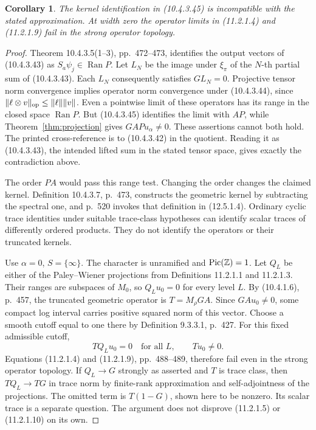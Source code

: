 \documentclass[11pt,reqno]{amsart}
\newtheorem{corollary}[theorem]{Corollary}
\numberwithin{equation}{section}
\begin{document}
\begin{corollary}
The kernel identification in (10.4.3.45) is incompatible with the stated approximation. At width zero the operator limits in (11.2.1.4) and (11.2.1.9) fail in the strong operator topology.
\end{corollary}
\begin{proof}

Theorem 10.4.3.5(1--3), pp.~472--473, identifies the output vectors of (10.4.3.43) as \(S_a\psi_j\in\operatorname{Ran}P\). Let \(L_N\) be the image under \(\xi_\pi\) of the \(N\)-th partial sum of (10.4.3.43). Each \(L_N\) consequently satisfies \(G L_N=0\). Projective tensor norm convergence implies operator norm convergence under (10.4.3.44), since \(\|\ell\otimes v\|_{\rm op}\le\|\ell\|\|v\|\). Even a pointwise limit of these operators has its range in the closed space \(\operatorname{Ran}P\). But (10.4.3.45) identifies the limit with \(AP\), while Theorem~\ref{thm:projection} gives \(GAPu_\alpha\ne0\). These assertions cannot both hold. The printed cross-reference is to (10.4.3.42) in the quotient. Reading it as (10.4.3.43), the intended lifted sum in the stated tensor space, gives exactly the contradiction above.

The order \(PA\) would pass this range test. Changing the order changes the claimed kernel. Definition 10.4.3.7, p.~473, constructs the geometric kernel by subtracting the spectral one, and p.~520 invokes that definition in (12.5.1.4). Ordinary cyclic trace identities under suitable trace-class hypotheses can identify scalar traces of differently ordered products. They do not identify the operators or their truncated kernels.
\par\smallskip
Use \(\alpha=0\), \(S=\{\infty\}\). The character is unramified and \(\operatorname{Pic}(\mathbb Z)=1\). Let \(Q_L\) be either of the Paley--Wiener projections from Definitions 11.2.1.1 and 11.2.1.3. Their ranges are subspaces of \(M_0\), so \(Q_Lu_0=0\) for every level \(L\). By (10.4.1.6), p.~457, the truncated geometric operator is \(T=M_\rho GA\). Since \(GAu_0\ne0\), some compact log interval carries positive squared norm of this vector. Choose a smooth cutoff equal to one there by Definition 9.3.3.1, p.~427. For this fixed admissible cutoff,
\[
                  TQ_Lu_0=0\quad\text{for all }L,\qquad Tu_0\ne0 .
\]
Equations (11.2.1.4) and (11.2.1.9), pp.~488--489, therefore fail even in the strong operator topology. If \(Q_L\to G\) strongly as asserted and \(T\) is trace class, then \(TQ_L\to TG\) in trace norm by finite-rank approximation and self-adjointness of the projections. The omitted term is \(T(1-G)\), shown here to be nonzero. Its scalar trace is a separate question. The argument does not disprove (11.2.1.5) or (11.2.1.10) on its own.
\end{proof}
\end{document}

